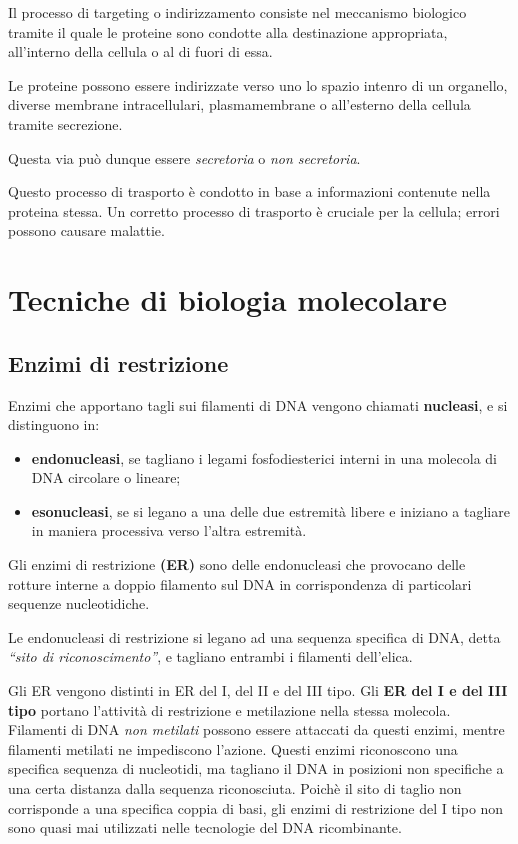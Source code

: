 \documentclass[11pt]{book}
\begin{document}
Il processo di targeting o indirizzamento consiste nel meccanismo
biologico tramite il quale le proteine sono condotte alla destinazione
appropriata, all'interno della cellula o al di fuori di essa.

Le proteine possono essere indirizzate verso uno lo spazio intenro di un
organello, diverse membrane intracellulari, plasmamembrane o all'esterno
della cellula tramite secrezione.

Questa via può dunque essere \emph{secretoria} o \emph{non secretoria}.

Questo processo di trasporto è condotto in base a informazioni contenute
nella proteina stessa. Un corretto processo di trasporto è cruciale per
la cellula; errori possono causare malattie.

\chapter{Tecniche di biologia
molecolare}\label{tecniche-di-biologia-molecolare}

\section{Enzimi di restrizione}\label{enzimi-di-restrizione}

Enzimi che apportano tagli sui filamenti di DNA vengono chiamati
\textbf{nucleasi}, e si distinguono in:

\begin{itemize}
\itemsep1pt\parskip0pt
\item
  \textbf{endonucleasi}, se tagliano i legami fosfodiesterici interni in
  una molecola di DNA circolare o lineare;
\item
  \textbf{esonucleasi}, se si legano a una delle due estremità libere e
  iniziano a tagliare in maniera processiva verso l'altra estremità.
\end{itemize}

Gli enzimi di restrizione \textbf{(ER)} sono delle endonucleasi che
provocano delle rotture interne a doppio filamento sul DNA in
corrispondenza di particolari sequenze nucleotidiche.

Le endonucleasi di restrizione si legano ad una sequenza specifica di
DNA, detta \emph{``sito di riconoscimento''}, e tagliano entrambi i
filamenti dell'elica.

Gli ER vengono distinti in ER del I, del II e del III tipo. Gli
\textbf{ER del I e del III tipo} portano l'attività di restrizione e
metilazione nella stessa molecola. Filamenti di DNA \emph{non metilati}
possono essere attaccati da questi enzimi, mentre filamenti metilati ne
impediscono l'azione. Questi enzimi riconoscono una specifica sequenza
di nucleotidi, ma tagliano il DNA in posizioni non specifiche a una
certa distanza dalla sequenza riconosciuta. Poichè il sito di taglio non
corrisponde a una specifica coppia di basi, gli enzimi di restrizione
del I tipo non sono quasi mai utilizzati nelle tecnologie del DNA
ricombinante.
\end{document}

